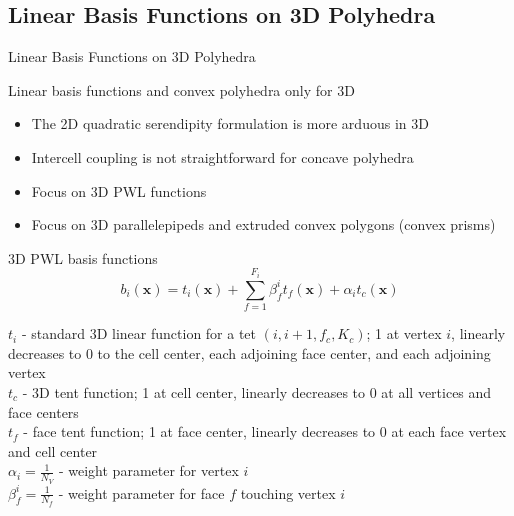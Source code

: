 \documentclass[compress,10pt]{beamer}
\renewcommand{\vec}[1]{\mathbf{#1}}
\begin{document}
\subsection{Linear Basis Functions on 3D Polyhedra}
\typeout{***********************************************************************************}
\begin{frame}[t]{Linear Basis Functions on 3D Polyhedra}
\begin{block}{Linear basis functions and convex polyhedra only for 3D}{\small
\begin{itemize}
\item The 2D quadratic serendipity formulation is more arduous in 3D
\item Intercell coupling is not straightforward for concave polyhedra
\item Focus on 3D PWL functions
\item Focus on 3D parallelepipeds and extruded convex polygons (convex prisms)
\end{itemize}}
\end{block}
\begin{block}{3D PWL basis functions}{\small
\begin{equation*}
b_i (\vec{x})  = t_i  (\vec{x})  + \sum_{f=1}^{F_i} \beta_f^i  t_f (\vec{x}) + \alpha_i t_c  (\vec{x}) 
\end{equation*}
}\end{block}
\begin{block}{}{\footnotesize
$t_i$ - standard 3D linear function for a tet $(i,i+1,f_c,K_c)$; 1 at vertex $i$, linearly decreases to 0 to the cell center, each adjoining face center, and each adjoining vertex\\ \vspace{0.5mm}
$t_c$ - 3D tent function; 1 at cell center, linearly decreases to 0 at all vertices and face centers \\ \vspace{0.5mm}
$t_f$ - face tent function; 1 at face center, linearly decreases to 0 at each face vertex and cell center\\ \vspace{0.5mm}
$\alpha_i = \frac{1}{N_V}$ - weight parameter for vertex $i$\\ \vspace{0.5mm}
$\beta_f^i = \frac{1}{N_f}$ - weight parameter for face $f$ touching vertex $i$
}\end{block}
\end{frame}
%
%
\end{document}

